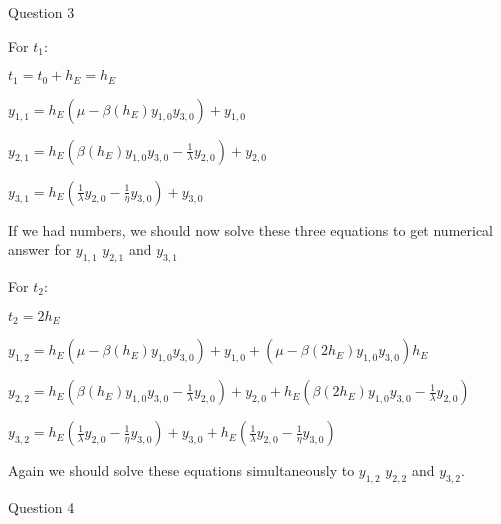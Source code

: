 \documentclass{beamer}
\begin{document}
\begin{frame}{Question 3}


For $t_1$:

$t_1 = t_0 + h_E = h_E$

$y_{1,1} = h_E(\mu - \beta (h_E)y_{1,0}y_{3,0}) + y_{1,0}$

$y_{2,1} = h_E\left(\beta (h_E)y_{1,0}y_{3,0} - \frac{1}{\lambda}y_{2,0}\right) + y_{2,0}$

$y_{3,1} = h_E\left(\frac{1}{\lambda}y_{2,0} - \frac{1}{\eta}y_{3,0} \right ) + y_{3,0}$

If we had numbers, we should now solve these three equations to get numerical answer for $y_{1,1}$ $y_{2,1}$ and $y_{3,1}$

For $t_2$:

$t_2 = 2h_E$

$y_{1,2} = h_E(\mu - \beta (h_E)y_{1,0}y_{3,0}) + y_{1,0} + (\mu - \beta(2h_E)y_{1,0}y_{3,0})h_E$

$y_{2,2} = h_E\left(\beta (h_E)y_{1,0}y_{3,0} - \frac{1}{\lambda}y_{2,0}\right) + y_{2,0} + h_E\left(\beta (2h_E)y_{1,0}y_{3,0} - \frac{1}{\lambda}y_{2,0}\right)$

$y_{3,2} = h_E\left(\frac{1}{\lambda}y_{2,0} - \frac{1}{\eta}y_{3,0} \right ) + y_{3,0} + h_E\left(\frac{1}{\lambda}y_{2,0} - \frac{1}{\eta}y_{3,0} \right )$

Again we should solve these equations simultaneously to $y_{1,2}$ $y_{2,2}$ and $y_{3,2}$.


\end{frame}

\begin{frame}{Question 4}
\end{frame}
\end{document}

